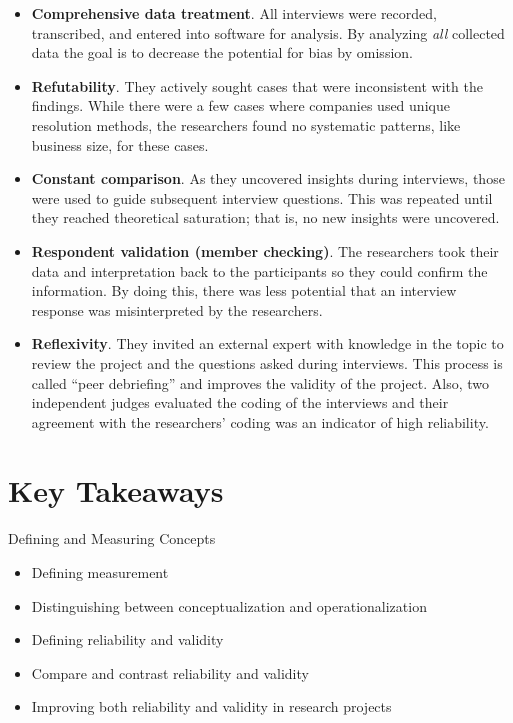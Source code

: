\begin{itemize}
	\item \textbf{Comprehensive data treatment}. All interviews were recorded, transcribed, and entered into software for analysis. By analyzing \textit{all} collected data the goal is to decrease the potential for bias by omission.
	\item \textbf{Refutability}. They actively sought cases that were inconsistent with the findings. While there were a few cases where companies used unique resolution methods, the researchers found no systematic patterns, like business size, for these cases.
	\item \textbf{Constant comparison}. As they uncovered insights during interviews, those were used to guide subsequent interview questions. This was repeated until they reached theoretical saturation; that is, no new insights were uncovered.
	\item \textbf{Respondent validation (member checking)}. The researchers took their data and interpretation back to the participants so they could confirm the information. By doing this, there was less potential that an interview response was misinterpreted by the researchers.
	\item \textbf{Reflexivity}. They invited an external expert with knowledge in the topic to review the project and the questions asked during interviews. This process is called ``peer debriefing'' and improves the validity of the project. Also, two independent judges evaluated the coding of the interviews and their agreement with the researchers' coding was an indicator of high reliability. 
\end{itemize}

\section{Key Takeaways}\label{ch05:summary}

\begin{center}
	\begin{tkawybox}{Defining and Measuring Concepts}
		\begin{itemize}
			\setlength{\itemsep}{0pt}
			\setlength{\parskip}{0pt}
			\setlength{\parsep}{0pt}
			
			\item Defining measurement
			\item Distinguishing between conceptualization and operationalization
			\item Defining reliability and validity 
			\item Compare and contrast reliability and validity
			\item Improving both reliability and validity in research projects
		\end{itemize}
	\end{tkawybox}
\end{center}
